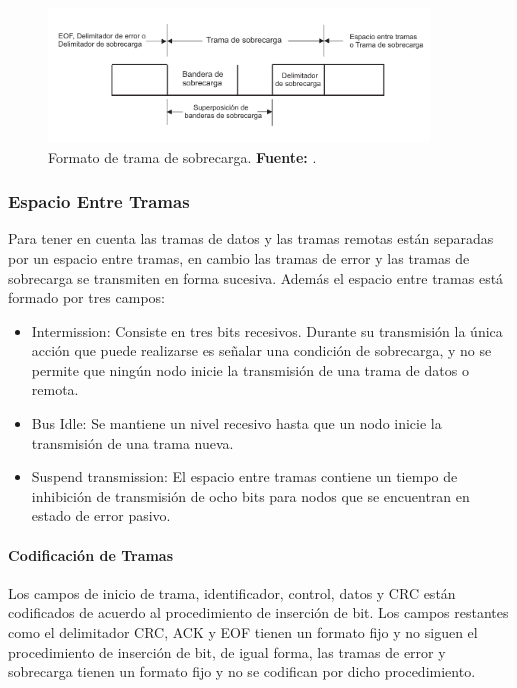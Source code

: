 \begin{itemize}
			\begin{figure}[H]
			\centering
				\includegraphics[width=0.9\textwidth]{./Cap2imagen/sobrecarga.pdf}
			\caption[Formato de trama de sobrecarga.]{Formato de trama de sobrecarga.\textbf{ Fuente:} \cite{DSEEPC}.}
			\label{TSC} 
			\end{figure}
				
\end{itemize}

\subsubsection {Espacio Entre Tramas}

Para tener en cuenta las tramas de datos y las tramas remotas están separadas por un espacio entre tramas, en cambio las tramas de error y las tramas de sobrecarga se transmiten en forma sucesiva.
Además el espacio entre tramas está formado por tres campos:

	\begin{itemize}
	\item Intermission: Consiste en tres bits recesivos. Durante su transmisión la única acción que puede realizarse es señalar una condición de sobrecarga, y no se permite que ningún nodo inicie la transmisión de una trama de datos o remota. 
	\item Bus Idle: Se mantiene un nivel recesivo hasta que un nodo inicie la transmisión de una trama nueva.
	\item Suspend transmission: El espacio entre tramas contiene un tiempo de inhibición de transmisión de ocho bits para nodos que se encuentran en estado de error pasivo.
	\end{itemize}


\paragraph{Codificación de Tramas}

Los campos de inicio de trama, identificador, control, datos y CRC están codificados de acuerdo al procedimiento de inserción de bit. Los campos restantes como el delimitador CRC, ACK y EOF tienen un formato fijo y no siguen el procedimiento de inserción de bit, de igual forma, las tramas de error y sobrecarga tienen un formato fijo y no se codifican por dicho procedimiento.


